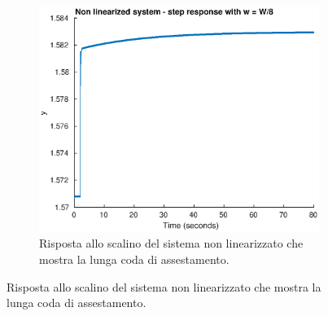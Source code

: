 \documentclass[a4paper]{article}
\begin{document}
\begin{figure}[h]
\begin{subfigure}[t]{0.3\textwidth}
\end{subfigure}
~
\begin{subfigure}[t]{0.3\textwidth}
    \centering
    \includegraphics[width=\textwidth]{step_nonlin_long}
    \caption{Risposta allo scalino del sistema non linearizzato che mostra la lunga coda di assestamento.}
    \label{fig:step_sim_nonlin_long}
\end{subfigure}
\end{figure}
\end{document}
